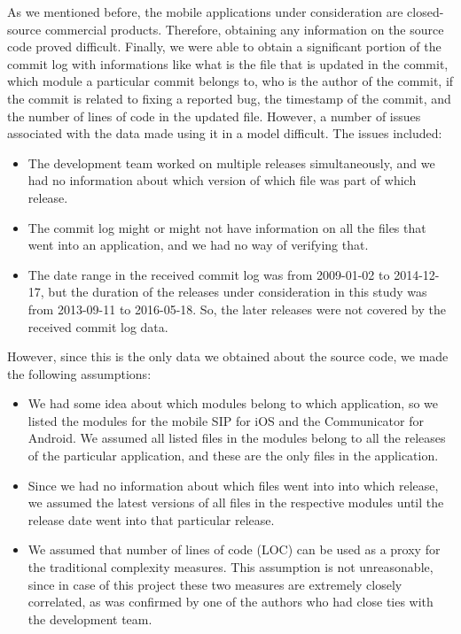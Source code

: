 \documentclass[smallcondensed]{svjour3}     %
\begin{document}
As we mentioned before, the mobile applications under consideration are closed-source commercial products. Therefore, obtaining any information on the source code proved difficult. Finally, we were able to obtain a significant portion of the commit log with informations like what is the file that is updated in the commit, which module a particular commit belongs to, who is the author of the commit, if the commit is related to fixing a reported bug, the timestamp of the commit, and the number of lines of code in the updated file. However, a number of issues associated with the data made using it in a model difficult. The issues included:
\begin{itemize}
\item The development team worked on multiple releases simultaneously, and we had no information about which version of which file was part of which release.
\item The commit log might or might not have information on all the files that went into an application, and we had no way of verifying that.
\item The date range in the received commit log was from 2009-01-02 to 2014-12-17, but the duration of the releases under consideration in this study was from 2013-09-11 to 2016-05-18. So, the later releases were not covered by the received commit log data.
\end{itemize}

However, since this is the only data we obtained about the source code, we made the following assumptions:

\begin{itemize}
\item We had some idea about which modules belong to which application, so we listed the modules for the mobile SIP for iOS and the Communicator for Android. We assumed all listed files in the modules belong to all the releases of the particular application, and these are the only files in the application.
\item Since we had no information about which files went into into which release, we assumed the latest versions of all files in the respective modules until the release date went into that particular release.
\item We assumed that number of lines of code (LOC) can be used as a proxy for the traditional complexity measures. This assumption is not unreasonable, since in case of this project these two measures are extremely closely correlated, as was confirmed by one of the authors who had close ties with the development team.
\end{itemize}
\end{document}
